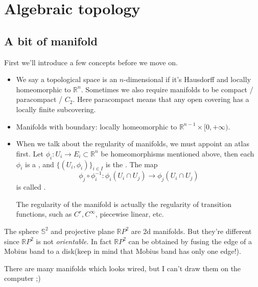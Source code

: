 \section{Algebraic topology}
\label{sec:Algebraic topology}

\subsection{A bit of manifold}
\label{sub:Intro}

First we'll introduce a few concepts before we move on.
\begin{itemize}
	\item We say a topological space is an $n$-dimensional 
	if it's Hausdorff and locally homeomorphic to $\mathbb{R}^{n}$.
	Sometimes we also require manifolds to be compact / paracompact / $C_2$.
	Here paracompact means that any open covering has a locally finite subcovering.

	\item Manifolds with boundary:
		locally homeomorphic to $\mathbb{R}^{n-1}\times [0, +\infty)$.

	\item When we talk about the regularity of manifolds, we must
		appoint an atlas first.
		Let $\phi_i: U_i \to E_i \subset \mathbb{R}^{n}$ be
		homeomorphisms mentioned above,
		then each $\phi_i$ is a , and $\{(U_i, \phi_i)\}_{i\in I}$ is
		the . The map
		\[
			\phi_j\circ\phi_i^{-1}: \phi_i(U_i\cap U_j)\to \phi_j(U_i\cap U_j)
		\]
		is called .

		The regularity of the manifold is actually the regularity of
		transition functions, such as $C^r, C^\infty$, piecewise linear, etc.
\end{itemize}
\begin{example}
    The sphere $\mathbb{S}^2$ and projective plane $\mathbb{R}P^2$ are 2d manifolds.
	But they're different since $\mathbb{R}P^2$ is not \textit{orientable}.
	In fact $\mathbb{R}P^2$ can be obtained by fusing the edge of a Mobius band
	to a disk(keep in mind that Mobius band has only one edge!).
\end{example}
There are many manifolds which looks wired, but I can't draw them on the computer ;)

